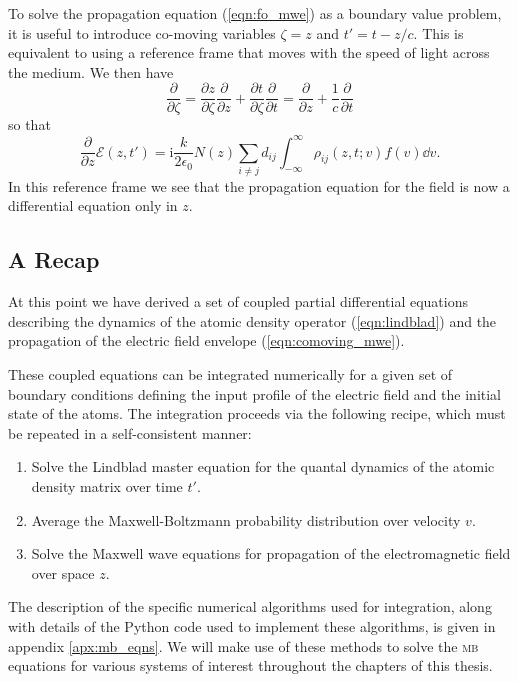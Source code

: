     To solve the propagation equation (\ref{eqn:fo_mwe}) as a boundary value
    problem, it is useful to introduce co-moving variables $\zeta = z$ and $t' =
    t - z/c$. This is equivalent to using a reference frame that moves with the
    speed of light across the medium.\cite{Icsevgi1964} We then have
    \begin{equation}
    \frac{\partial}{\partial \zeta} = \frac{\partial z}{\partial \zeta} \frac{\partial}{\partial z} +  \frac{\partial t}{\partial \zeta} \frac{\partial}{\partial t} = \frac{\partial}{\partial z} + \frac{1}{c} \frac{\partial}{\partial t}      
    \end{equation}
    so that
    \begin{equation}\label{eqn:comoving_mwe}
      \frac{\partial}{\partial z} \mathcal{E}(z,t') = 
        \mathrm{i} \frac{k}{2 \epsilon_0}
        N(z) \sum_{i \ne j} d_{ij} \int_{-\infty}^{\infty} 
          \rho_{ij}(z,t; v) f(v) {\dd v}. 
    \end{equation}
    In this reference frame we see that the propagation equation for the field
    is now a differential equation only in $z$.

  \subsection{A Recap}

    At this point we have derived a set of coupled partial differential
    equations describing the dynamics of the atomic density operator
    (\ref{eqn:lindblad}) and the propagation of the electric field envelope
    (\ref{eqn:comoving_mwe}).

    These coupled equations can be integrated numerically for a given set of
    boundary conditions defining the input profile of the electric field and the
    initial state of the atoms. The integration proceeds via the following
    recipe, which must be repeated in a self-consistent manner:
    \begin{enumerate}
      \item Solve the Lindblad master equation for the quantal dynamics of the
        atomic density matrix over time $t'$.
      \item Average the Maxwell-Boltzmann probability distribution over velocity
        $v$.
      \item Solve the Maxwell wave equations for propagation of the 
        electromagnetic field over space $z$.
    \end{enumerate}

    The description of the specific numerical algorithms used for integration,
    along with details of the Python code used to implement these algorithms, is
    given in appendix \ref{apx:mb_eqns}. We will make use of these methods to
    solve the \textsc{mb} equations for various systems of interest throughout
    the chapters of this thesis.

